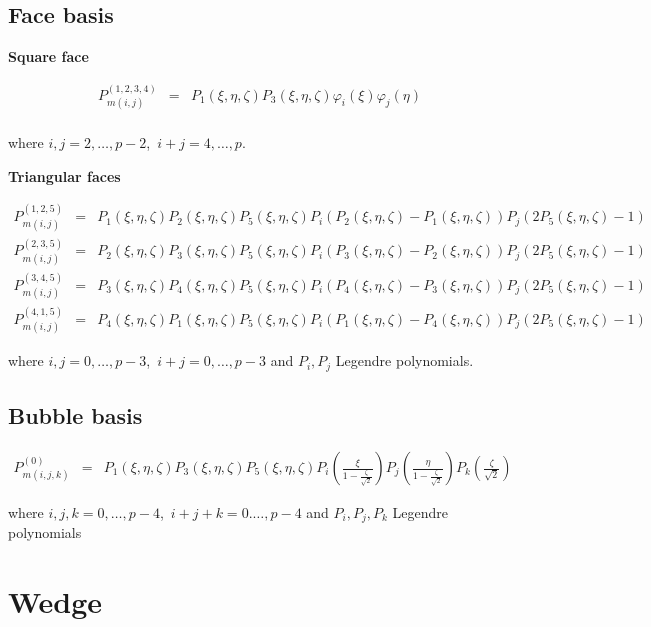 \subsection{Face basis}

\noindent \textbf{Square face}

\begin{eqnarray*} 
P_{m(i,j)}^{(1,2,3,4)}&=&P_1(\xi,\eta,\zeta)P_3(\xi,\eta,\zeta)
\varphi_i(\xi)\varphi_j(\eta) \\ 
\end{eqnarray*}

\noindent where $i,j=2,\ldots,p-2$,\ $i+j=4,\ldots,p$. 

\noindent \textbf{Triangular faces}

\begin{eqnarray*}
P_{m(i,j)}^{(1,2,5)}&=&P_1(\xi,\eta,\zeta)P_2(\xi,\eta,\zeta)
P_5(\xi,\eta,\zeta)
P_i(P_2(\xi,\eta,\zeta)-P_1(\xi,\eta,\zeta))
P_j(2P_5(\xi,\eta,\zeta)-1) \\
P_{m(i,j)}^{(2,3,5)}&=&P_2(\xi,\eta,\zeta)P_3(\xi,\eta,\zeta)
P_5(\xi,\eta,\zeta)
P_i(P_3(\xi,\eta,\zeta)-P_2(\xi,\eta,\zeta))
P_j(2P_5(\xi,\eta,\zeta)-1) \\
P_{m(i,j)}^{(3,4,5)}&=&P_3(\xi,\eta,\zeta)P_4(\xi,\eta,\zeta)
P_5(\xi,\eta,\zeta)
P_i(P_4(\xi,\eta,\zeta)-P_3(\xi,\eta,\zeta))
P_j(2P_5(\xi,\eta,\zeta)-1) \\
P_{m(i,j)}^{(4,1,5)}&=&P_4(\xi,\eta,\zeta)P_1(\xi,\eta,\zeta)
P_5(\xi,\eta,\zeta)
P_i(P_1(\xi,\eta,\zeta)-P_4(\xi,\eta,\zeta))
P_j(2P_5(\xi,\eta,\zeta)-1)
\end{eqnarray*}

\noindent where $i,j=0,\ldots,p-3$,\ $i+j=0,\ldots,p-3$ and $P_i,P_j$
Legendre polynomials.

\subsection{Bubble basis} 

\begin{eqnarray*}
P_{m(i,j,k)}^{(0)}&=&P_1(\xi,\eta,\zeta)P_3(\xi,\eta,\zeta)
P_5(\xi,\eta,\zeta)P_i(\frac{\xi}{1-\frac{\zeta}{\sqrt{2}}})
P_j(\frac{\eta}{1-\frac{\zeta}{\sqrt{2}}})P_k(\frac{\zeta}{\sqrt{2}})
\end{eqnarray*}

\noindent where $i,j,k=0,\ldots,p-4$,\ $i+j+k=0.\ldots,p-4$ and
$P_i,P_j,P_k$ Legendre polynomials

\section{Wedge}

